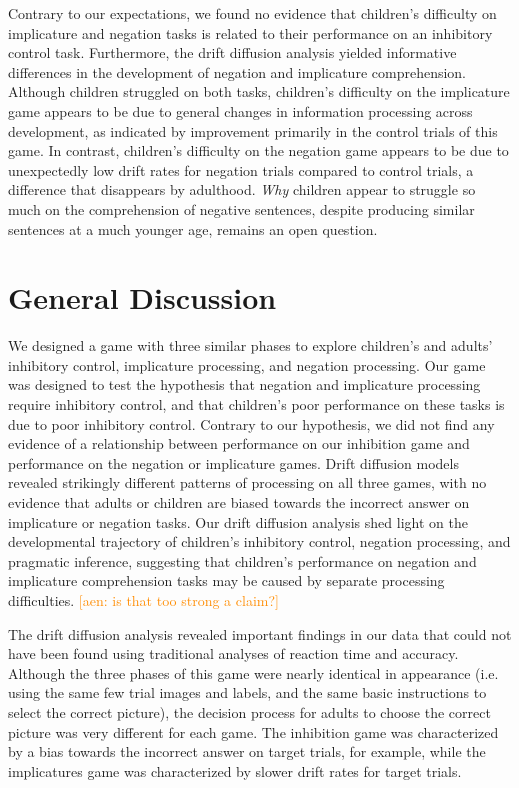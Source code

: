 \documentclass[10pt,letterpaper]{article}
\newcommand{\aen}[1]{\textcolor{DarkOrange}{[aen: #1]}}
\begin{document}
Contrary to our expectations, we found no evidence that children's difficulty on implicature and negation tasks is related to their performance on an inhibitory control task.  Furthermore, the drift diffusion analysis yielded informative differences in the development of negation and implicature comprehension.  Although children struggled on both tasks, children's difficulty on the implicature game appears to be due to general changes in information processing across development, as indicated by improvement primarily in the control trials of this game.  In contrast, children's difficulty on the negation game appears to be due to unexpectedly low drift rates for negation trials compared to control trials, a difference that disappears by adulthood.  \emph{Why} children appear to struggle so much on the comprehension of negative sentences, despite producing similar sentences at a much younger age, remains an open question.  


\section{General Discussion}

We designed a game with three similar phases to explore children's and adults' inhibitory control, implicature processing, and negation processing.  Our game was designed to test the hypothesis that negation and implicature processing require inhibitory control, and that children's poor performance on these tasks is due to poor inhibitory control.  Contrary to our hypothesis, we did not find any evidence of a relationship between performance on our inhibition game and performance on the negation or implicature games.  Drift diffusion models revealed strikingly different patterns of processing on all three games, with no evidence that adults or children are biased towards the incorrect answer on implicature or negation tasks.  Our drift diffusion analysis shed light on the developmental trajectory of children's inhibitory control, negation processing, and pragmatic inference, suggesting that children's performance on negation and implicature comprehension tasks may be caused by separate processing difficulties. \aen{is that too strong a claim?}

The drift diffusion analysis revealed important findings in our data that could not have been found using traditional analyses of reaction time and accuracy.  Although the three phases of this game were nearly identical in appearance (i.e. using the same few trial images and labels, and the same basic instructions to select the correct picture), the decision process for adults to choose the correct picture was very different for each game.  The inhibition game was characterized by a bias towards the incorrect answer on target trials, for example, while the implicatures game was characterized by slower drift rates for target trials.  
\end{document}
